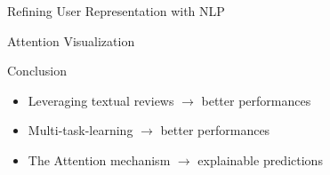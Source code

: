 \begin{section}{Refining User Representation with NLP}
\begin{frame}{Attention Visualization}
\end{frame}
    \begin{frame}{Conclusion}
        \begin{itemize}
            \item Leveraging textual reviews $\rightarrow$ better performances
            \item Multi-task-learning $\rightarrow$ better performances
            \item The Attention mechanism $\rightarrow$ explainable predictions
        \end{itemize}
    \end{frame}
\end{section}